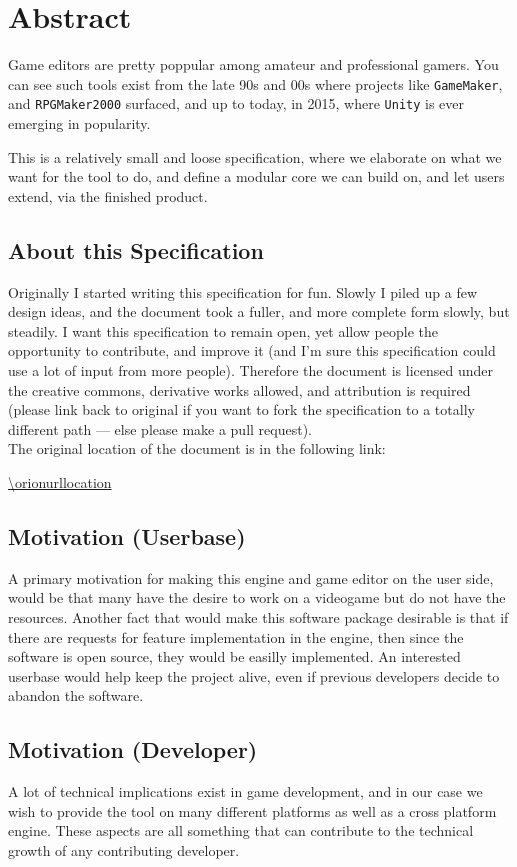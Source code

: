\section{Abstract}

Game editors are pretty poppular among amateur and professional gamers. You can
see such tools exist from the late 90s and 00s where projects like
\texttt{GameMaker}, and \texttt{RPGMaker2000} surfaced, and up to today, in
2015, where \texttt{Unity} is ever emerging in popularity.

This is a relatively small and loose specification, where we elaborate on what
we want for the tool to do, and define a modular core we can build on, and let
users extend, via the finished product.

\subsection{About this Specification}

Originally I started writing this specification for fun. Slowly I piled up a few
design ideas, and the document took a fuller, and more complete form slowly, but
steadily. I want this specification to remain open, yet allow people the
opportunity to contribute, and improve it (and I'm sure this specification could
use a lot of input from more people). Therefore the document is licensed under
the creative commons, derivative works allowed, and attribution is required
(please link back to original if you want to fork the specification to a totally
different path --- else please make a pull request).
\\[0.2in]
\noindent The original location of the document is in the following link:

\url{\orionurllocation}

\subsection{Motivation (Userbase)}

A primary motivation for making this engine and game editor on the user side,
would be that many have the desire to work on a videogame but do not have the
resources. Another fact that would make this software package desirable is that
if there are requests for feature implementation in the engine, then since the
software is open source, they would be easilly implemented. An interested
userbase would help keep the project alive, even if previous developers decide
to abandon the software.

\subsection{Motivation (Developer)}

A lot of technical implications exist in game development, and in our case we
wish to provide the tool on many different platforms as well as a cross platform
engine. These aspects are all something that can contribute to the technical
growth of any contributing developer.

